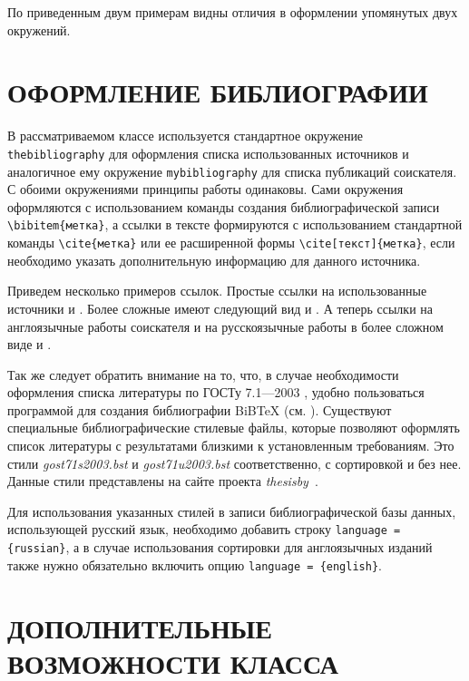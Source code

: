 По приведенным двум примерам видны отличия в оформлении упомянутых двух
окружений.


\chapter{ОФОРМЛЕНИЕ БИБЛИОГРАФИИ}

В рассматриваемом классе используется стандартное окружение
\verb|thebibliography| для оформления списка использованных источников и
аналогичное ему окружение \verb|mybibliography| для списка публикаций
соискателя. С обоими окружениями принципы работы одинаковы. Сами окружения
оформляются с использованием команды создания библиографической записи
\verb|\bibitem{метка}|, а ссылки в тексте формируются с использованием
стандартной команды \verb|\cite{метка}| или ее расширенной формы
\verb|\cite[текст]{метка}|, если необходимо указать дополнительную информацию
для данного источника.

Приведем несколько примеров ссылок. Простые ссылки на использованные источники
\cite{Kotelnikov,article} и
\cite{proc}. Более сложные имеют следующий вид \cite[с. 25]{Kotelnikov} и
\cite[формула 2]{article}. А теперь ссылки на англоязычные работы соискателя
\cite{myarticle,myproc}  и на русскоязычные работы в более сложном виде
\cite[формула~4]{myrussianarticle} и \cite[глава~2]{mybook}.

Так же следует обратить внимание на то, что, в случае необходимости оформления
списка литературы по ГОСТу 7.1—2003 \cite{gost7-1}, удобно пользоваться программой для создания библиографии BiBTeX (см. \cite[глава 13]{Kotelnikov}). Существуют специальные
библиографические стилевые файлы, которые позволяют оформлять список литературы
с результатами близкими к установленным требованиям. Это стили {\itshape
gost71s2003.bst} и {\itshape gost71u2003.bst} соответственно, с сортировкой и без
нее. Данные стили представлены на сайте проекта {\itshape thesisby}~\cite{gost71_2003}.

Для использования указанных стилей в записи  библиографической базы
данных, использующей русский язык, необходимо добавить строку
\verb|language = {russian}|, а в случае использования сортировки для англоязычных изданий также нужно обязательно включить опцию \verb|language = {english}|.


\chapter{ДОПОЛНИТЕЛЬНЫЕ ВОЗМОЖНОСТИ КЛАССА}

